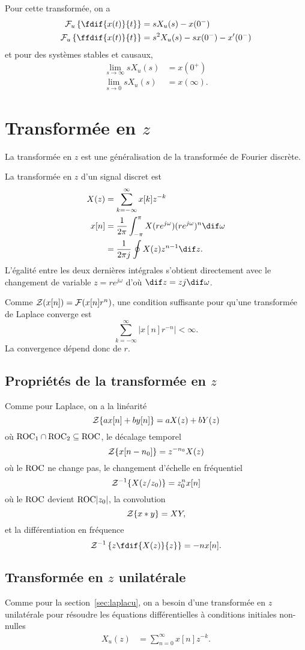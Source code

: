 Pour cette transformée, on a
\begin{align*}
  \laplacu\left\{\fdif{x(t)}{t}\right\} & =
  sX_u(s) - x(0^-)\\
  \laplacu\left\{\ffdif{x(t)}{t}\right\} & =
  s^2X_u(s) - sx(0^-) - x'(0^-)
\end{align*}
et pour des systèmes stables et causaux,
\begin{align*}
  \lim_{s\to\infty} sX_u(s) & = x(0^+)\\
  \lim_{s\to 0} sX_u(s) & = x(\infty).
\end{align*}

\section{Transformée en $z$}
La transformée en $z$ est une généralisation de la transformée de Fourier
discrète.

La transformée en $z$ d'un signal discret est
\begin{align*}
  X(z) & = \sum_{k=-\infty}^{\infty} x[k]z^{-k}\\
  x[n] & =
  \frac{1}{2\pi}\int_{-\pi}^{\pi} X(re^{j\omega})(re^{j\omega})^n\dif \omega\\
  & = \frac{1}{2\pi j}\oint X(z) z^{n-1} \dif z.
\end{align*}
L'égalité entre les deux dernières intégrales
s'obtient directement avec le changement
de variable $z = re^{j\omega}$ d'où $\dif z = zj\dif \omega$.

Comme $\mathcal{Z}(x[n]) = \mathcal{F}(x[n]r^n)$,
une condition suffisante pour qu'une transformée de Laplace converge est
\[ \sum_{k=-\infty}^\infty|x[n]r^{-n}| < \infty. \]
La convergence dépend donc de $r$.

\subsection{Propriétés de la transformée en $z$}
Comme pour Laplace, on a la linéarité
\[ \mathcal{Z}\{ax[n]+by[n]\} = aX(z) + bY(z) \]
où $\mathrm{ROC}_1 \cap \mathrm{ROC}_2 \subseteq \mathrm{ROC}$,
le décalage temporel
\[ \mathcal{Z}\{x[n-n_0]\} = z^{-n_0}X(z) \]
où le $\mathrm{ROC}$ ne change pas,
le changement d'échelle en fréquentiel
\[ \mathcal{Z}^{-1}\{X(z/z_0)\} = z_0^nx[n] \]
où le $\mathrm{ROC}$ devient $\mathrm{ROC} |z_0|$,
la convolution
\[ \mathcal{Z}\{x*y\} = XY, \]
et la différentiation en fréquence
\[ \transfz^{-1}\left\{z\fdif{X(z)}{z}\right\} = -nx[n]. \]

\subsection{Transformée en $z$ unilatérale}
Comme pour la section~\ref{sec:laplacu}, on a besoin
d'une transformée en $z$ unilatérale pour résoudre les équations
différentielles à conditions initiales non-nulles
\begin{align*}
  X_u(z) & = \sum_{n=0}^\infty x[n] z^{-k}.
\end{align*}

